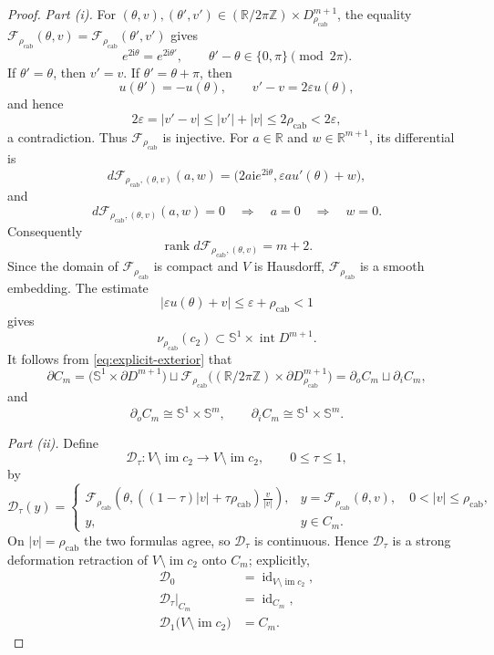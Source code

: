 \documentclass[11pt,reqno]{amsart}
\theoremstyle{definition}
\numberwithin{equation}{section}
\newcommand{\rhoCab}{{\rho_{\mathrm{cab}}}}
\begin{document}
\begin{proof}
\emph{Part \textup{(i)}.}
For $(\theta,v),(\theta',v')\in
(\mathbb R/2\pi\mathbb Z)\times D^{m+1}_{\rhoCab}$, the equality
$\mathcal F_{\rhoCab}(\theta,v)
 =\mathcal F_{\rhoCab}(\theta',v')$ gives
\[
 e^{2\mathrm i\theta}=e^{2\mathrm i\theta'},
 \qquad
 \theta'-\theta\in\{0,\pi\}\pmod{2\pi}.
\]
If $\theta'=\theta$, then $v'=v$.  If
$\theta'=\theta+\pi$, then
\[
 u(\theta')=-u(\theta),
 \qquad
 v'-v=2\varepsilon u(\theta),
\]
and hence
\[
 2\varepsilon=|v'-v|\le |v'|+|v|\le2\rhoCab<2\varepsilon,
\]
a contradiction.  Thus $\mathcal F_{\rhoCab}$ is injective.  For
$a\in\mathbb R$ and $w\in\mathbb R^{m+1}$, its differential is
\[
 d\mathcal F_{\rhoCab,(\theta,v)}(a,w)
 =\bigl(2a\mathrm i e^{2\mathrm i\theta},
         \varepsilon a u'(\theta)+w\bigr),
\]
and
\[
 d\mathcal F_{\rhoCab,(\theta,v)}(a,w)=0
 \quad\Longrightarrow\quad a=0\quad\Longrightarrow\quad w=0.
\]
Consequently
\[
 \operatorname{rank}d\mathcal F_{\rhoCab,(\theta,v)}=m+2.
\]
Since the domain of $\mathcal F_{\rhoCab}$ is compact and $V$ is Hausdorff,
$\mathcal F_{\rhoCab}$ is a smooth embedding.  The estimate
\[
 |\varepsilon u(\theta)+v|\le\varepsilon+\rhoCab<1
\]
gives
\[
 \nu_{\rhoCab}(c_2)\subset\mathbb S^1\times\operatorname{int}D^{m+1}.
\]
It follows from \eqref{eq:explicit-exterior} that
\[
 \partial C_m
 =\bigl(\mathbb S^1\times\partial D^{m+1}\bigr)
  \sqcup
  \mathcal F_{\rhoCab}
  \bigl((\mathbb R/2\pi\mathbb Z)\times
                         \partial D^{m+1}_{\rhoCab}\bigr)
 =\partial_oC_m\sqcup\partial_iC_m,
\]
and
\[
 \partial_oC_m\cong\mathbb S^1\times\mathbb S^m,
 \qquad
 \partial_iC_m\cong\mathbb S^1\times\mathbb S^m.
\]

\emph{Part \textup{(ii)}.}
Define
\[
\mathcal D_\tau:V\setminus\operatorname{im}c_2\longrightarrow
                  V\setminus\operatorname{im}c_2,
 \qquad 0\le\tau\le1,
\]
by
\[
\mathcal D_\tau(y)=
 \begin{cases}
 \displaystyle
 \mathcal F_{\rhoCab}\left(\theta,
  \left((1-\tau)|v|+\tau\rhoCab\right)\frac{v}{|v|}\right),
 &y=\mathcal F_{\rhoCab}(\theta,v),\quad0<|v|\le\rhoCab,\\[3mm]
 y,&y\in C_m.
 \end{cases}
\]
On $|v|=\rhoCab$ the two formulas agree, so $\mathcal D_\tau$ is
continuous.  Hence $\mathcal D_\tau$ is a strong deformation retraction
of $V\setminus\operatorname{im}c_2$ onto $C_m$; explicitly,
\begin{align*}
 \mathcal D_0&=\operatorname{id}_{V\setminus\operatorname{im}c_2},\\
 \mathcal D_\tau|_{C_m}&=\operatorname{id}_{C_m},\\
 \mathcal D_1\bigl(V\setminus\operatorname{im}c_2\bigr)&=C_m.
\end{align*}


\end{proof}
\end{document}
